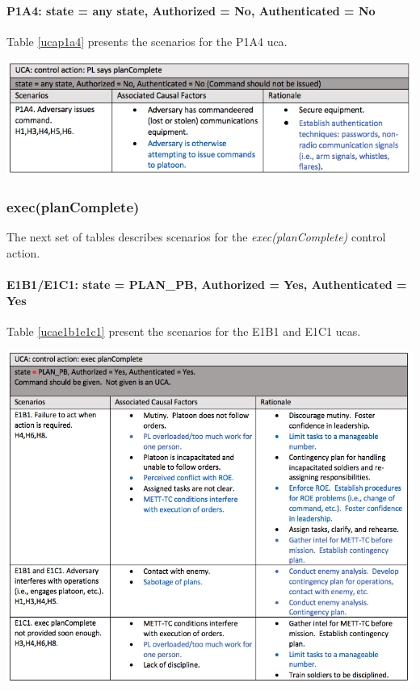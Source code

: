\documentclass[../../main/main.tex]{subfiles}
\begin{document}
\paragraph*{P1A4: state  = any state, Authorized = No, Authenticated = No}
Table \ref{ucap1a4} presents the scenarios for the P1A4 \gls{uca}.

\begin{table}[ht!]
\begin{center}
\includegraphics[width=\linewidth]{../figures/ucap1a4}
\caption{Scenarios for UCA P1A4.}
\label{ucap1a4}
\end{center}
\end{table}
\clearpage


\subsubsection*{exec(planComplete)}
The next set of tables describes scenarios for the \textit{exec(planComplete)} control action.

\paragraph*{E1B1/E1C1: state = PLAN_PB, Authorized = Yes, Authenticated = Yes}
Table \ref{ucae1b1e1c1}  present the scenarios for the E1B1 and E1C1 \glspl{uca}.

\begin{table}[ht!]
\begin{center}
\includegraphics[width=\linewidth]{../figures/ucae1b1e1c1}
\caption{Scenarios for UCAs E1B1 and E1C1.}
\label{ucae1b1e1c1}
\end{center}
\end{table}
\clearpage
\end{document}
